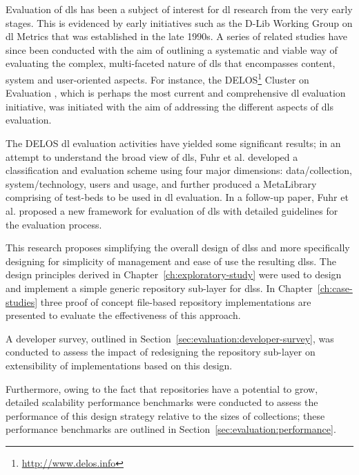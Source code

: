 Evaluation of \glspl{dl} has been a subject of interest for \gls{dl} research from the very early stages. This is evidenced by early initiatives such as the D-Lib Working Group on \gls{dl} Metrics \citep{DLWG1998} that was established in the late 1990s. A series of related studies have since been conducted with the aim of outlining a systematic and viable way of evaluating the complex, multi-faceted nature of \glspl{dl} that encompasses content, system and user-oriented aspects. For instance, the DELOS\footnote{\url{http://www.delos.info}} Cluster on Evaluation \citep{Borgman2002,DELOSW72004}, which is perhaps the most current and comprehensive \gls{dl} evaluation initiative, was initiated with the aim of addressing the different aspects of \glspl{dl} evaluation.

The DELOS \gls{dl} evaluation activities have yielded some significant results; in an attempt to understand the broad view of \glspl{dl}, Fuhr et al. \citep{Fuhr2001} developed a classification and evaluation scheme using four major dimensions: data/collection, system/technology, users and usage, and further produced a MetaLibrary comprising of test-beds to be used in \gls{dl} evaluation. In a follow-up paper, Fuhr et al. \citep{Fuhr2007} proposed a new framework for evaluation of \glspl{dl} with detailed guidelines for the evaluation process.

This research proposes simplifying the overall design of \glspl{dls} and more specifically designing for simplicity of management and ease of use the resulting \glspl{dls}. The design principles derived in Chapter~\ref{ch:exploratory-study} were used to design and implement a simple generic repository sub-layer for \glspl{dls}. In Chapter~\ref{ch:case-studies} three proof of concept file-based repository implementations are presented to evaluate the effectiveness of this approach. 

A developer survey, outlined in Section~\ref{sec:evaluation:developer-survey}, was conducted to assess the impact of redesigning the repository sub-layer on extensibility of implementations based on this design. 

Furthermore, owing to the fact that repositories have a potential to grow, detailed scalability performance benchmarks were conducted to assess the performance of this design strategy relative to the sizes of collections; these performance benchmarks are outlined in Section~\ref{sec:evaluation:performance}.